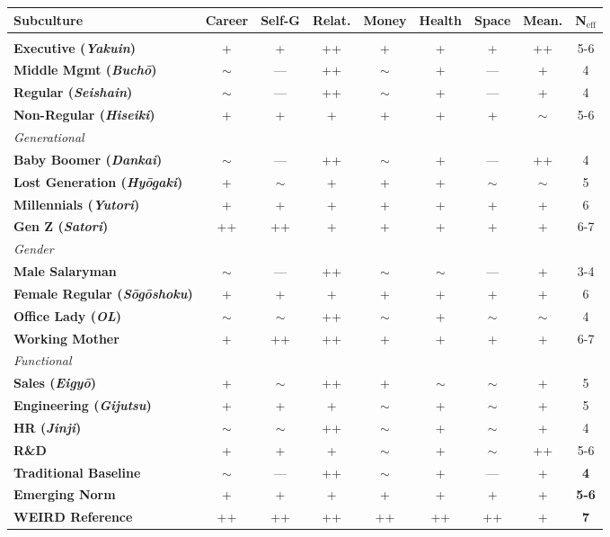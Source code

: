 \begin{center}
\tiny
\begin{longtable}{@{}l|ccccccc|c@{}}
\toprule
\textbf{Subculture} & \textbf{Career} & \textbf{Self-G} & \textbf{Relat.} & \textbf{Money} & \textbf{Health} & \textbf{Space} & \textbf{Mean.} & \textbf{N$_{\text{eff}}$} \\
\midrule
\endfirsthead
\bottomrule
\endlastfoot
\multicolumn{9}{l}{\textit{Hierarchical Position}} \\
\textbf{Executive (\textit{Yakuin})} & + & + & ++ & + & + & + & ++ & 5-6 \\
\textbf{Middle Mgmt (\textit{Buchō})} & $\sim$ & — & ++ & $\sim$ & + & — & + & 4 \\
\textbf{Regular (\textit{Seishain})} & $\sim$ & — & ++ & $\sim$ & + & — & + & 4 \\
\textbf{Non-Regular (\textit{Hiseiki})} & + & + & + & + & + & + & $\sim$ & 5-6 \\
\midrule
\multicolumn{9}{l}{\textit{Generational}} \\
\textbf{Baby Boomer (\textit{Dankai})} & $\sim$ & — & ++ & $\sim$ & + & — & ++ & 4 \\
\textbf{Lost Generation (\textit{Hyōgaki})} & + & $\sim$ & + & + & + & $\sim$ & $\sim$ & 5 \\
\textbf{Millennials (\textit{Yutori})} & + & + & + & + & + & + & + & 6 \\
\textbf{Gen Z (\textit{Satori})} & ++ & ++ & + & + & + & + & + & 6-7 \\
\midrule
\multicolumn{9}{l}{\textit{Gender}} \\
\textbf{Male Salaryman} & $\sim$ & — & ++ & $\sim$ & $\sim$ & — & + & 3-4 \\
\textbf{Female Regular (\textit{Sōgōshoku})} & + & + & + & + & + & + & + & 6 \\
\textbf{Office Lady (\textit{OL})} & $\sim$ & $\sim$ & ++ & $\sim$ & + & $\sim$ & $\sim$ & 4 \\
\textbf{Working Mother} & + & ++ & ++ & + & + & + & + & 6-7 \\
\midrule
\multicolumn{9}{l}{\textit{Functional}} \\
\textbf{Sales (\textit{Eigyō})} & + & $\sim$ & ++ & + & $\sim$ & $\sim$ & + & 5 \\
\textbf{Engineering (\textit{Gijutsu})} & + & + & + & $\sim$ & + & $\sim$ & + & 5 \\
\textbf{HR (\textit{Jinji})} & $\sim$ & $\sim$ & ++ & $\sim$ & + & $\sim$ & + & 4 \\
\textbf{R\&D} & + & + & + & $\sim$ & + & $\sim$ & ++ & 5-6 \\
\midrule
\midrule
\textbf{Traditional Baseline} & $\sim$ & — & ++ & $\sim$ & + & — & + & \textbf{4} \\
\textbf{Emerging Norm} & + & + & + & + & + & + & + & \textbf{5-6} \\
\textbf{WEIRD Reference} & ++ & ++ & ++ & ++ & ++ & ++ & + & \textbf{7} \\
\end{longtable}
\end{center}

